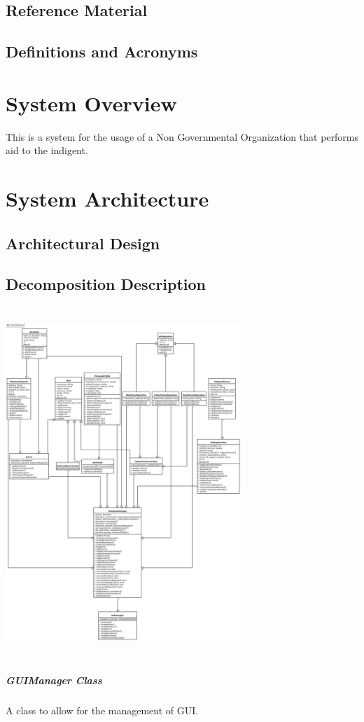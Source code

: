 \documentclass[a4paper,12pt]{report}
\begin{document}
		\section{Reference Material}
		\section{Definitions and Acronyms}
	\chapter{System Overview}
		This is a system for the usage of a Non Governmental Organization that performs aid to the indigent.  
	\chapter{System Architecture}
		\section{Architectural Design}
			
		\section{Decomposition Description}
			\includegraphics[width=252pt,height=375pt]{class_diagram.png} %
			\paragraph{GUIManager Class}
			A class to allow for the management of GUI.
\end{document}
